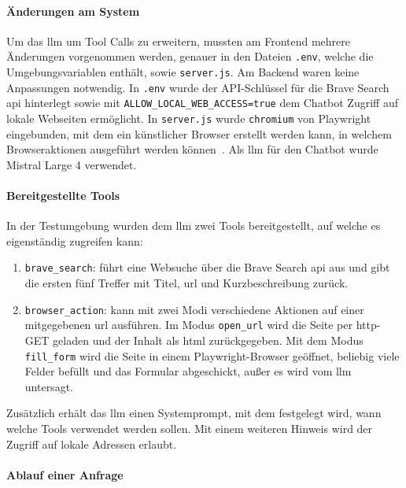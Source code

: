 \paragraph{Änderungen am System}

Um das \ac{llm} um Tool Calls zu erweitern, mussten am Frontend mehrere Änderungen vorgenommen werden, genauer in den Dateien \texttt{.env}, welche die 
Umgebungsvariablen enthält, sowie \texttt{server.js}. Am Backend waren keine Anpassungen notwendig. In  \texttt{.env} wurde der API-Schlüssel für die 
Brave Search \ac{api} hinterlegt sowie mit \texttt{ALLOW\_LOCAL\_WEB\_ACCESS=true} dem Chatbot Zugriff auf lokale Webseiten ermöglicht. In \texttt{server.js}
wurde \texttt{chromium} von Playwright eingebunden, mit dem ein künstlicher Browser erstellt werden kann, in welchem Browseraktionen ausgeführt werden können~\cite{an15}.
Als \ac{llm} für den Chatbot wurde Mistral Large 4 verwendet. 

\paragraph{Bereitgestellte Tools}

In der Testumgebung wurden dem \ac{llm} zwei Tools bereitgestellt, auf welche es eigenständig zugreifen kann: 

\begin{enumerate}
    \item \texttt{brave\_search}: führt eine Websuche über die Brave Search \ac{api} aus und gibt die ersten fünf Treffer mit Titel, \ac{url} und Kurzbeschreibung zurück.
    \item \texttt{browser\_action}: kann mit zwei Modi verschiedene Aktionen auf einer mitgegebenen \ac{url} ausführen. Im Modus \texttt{open\_url} wird die Seite 
    per \ac{http}-GET geladen und der Inhalt als \ac{html} zurückgegeben. Mit dem Modus \texttt{fill\_form} wird die Seite in einem Playwright-Browser geöffnet, beliebig 
    viele Felder befüllt und das Formular abgeschickt, außer es wird vom \ac{llm} untersagt.
\end{enumerate}

Zusätzlich erhält das \ac{llm} einen Systemprompt, mit dem festgelegt wird, wann welche Tools verwendet werden sollen. Mit einem weiteren Hinweis wird der Zugriff
auf lokale Adressen erlaubt.

\paragraph{Ablauf einer Anfrage}

